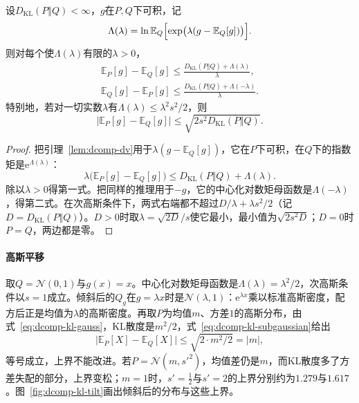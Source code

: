 \begin{theorem}[KL控制的期望差]
\label{thm:dcomp-kl-expectation}
设$D_{\mathrm{KL}}(P\Vert Q)<\infty$，$g$在$P,Q$下可积，记
\begin{equation}
 \Lambda(\lambda)=\ln\mathbb{E}_{Q}\Bigl[\exp\bigl(\lambda(g-\mathbb{E}_{Q}[g])\bigr)\Bigr] .
 \label{eq:dcomp-centered-cgf}
\end{equation}
则对每个使$\Lambda(\lambda)$有限的$\lambda>0$，
\begin{equation}
 \begin{gathered}
 \mathbb{E}_{P}[g]-\mathbb{E}_{Q}[g]\leq\frac{D_{\mathrm{KL}}(P\Vert Q)+\Lambda(\lambda)}{\lambda},\\
 \mathbb{E}_{Q}[g]-\mathbb{E}_{P}[g]\leq\frac{D_{\mathrm{KL}}(P\Vert Q)+\Lambda(-\lambda)}{\lambda} .
 \end{gathered}
 \label{eq:dcomp-kl-two-sides}
\end{equation}
特别地，若对一切实数$\lambda$有$\Lambda(\lambda)\leq\lambda^{2}s^{2}/2$，则
\begin{equation}
 \bigl\lvert\mathbb{E}_{P}[g]-\mathbb{E}_{Q}[g]\bigr\rvert\leq\sqrt{2s^{2}D_{\mathrm{KL}}(P\Vert Q)} .
 \label{eq:dcomp-kl-subgaussian}
\end{equation}
\end{theorem}

\begin{proof}
把引理~\ref{lem:dcomp-dv}用于$\lambda(g-\mathbb{E}_{Q}[g])$，它在$P$下可积，在$Q$下的指数矩是$\mathrm{e}^{\Lambda(\lambda)}$：
\[
 \lambda\bigl(\mathbb{E}_{P}[g]-\mathbb{E}_{Q}[g]\bigr)\leq D_{\mathrm{KL}}(P\Vert Q)+\Lambda(\lambda) .
\]
除以$\lambda>0$得第一式。把同样的推理用于$-g$，它的中心化对数矩母函数是$\Lambda(-\lambda)$，得第二式。在次高斯条件下，两式右端都不超过$D/\lambda+\lambda s^{2}/2$（记$D=D_{\mathrm{KL}}(P\Vert Q)$）。$D>0$时取$\lambda=\sqrt{2D}/s$使它最小，最小值为$\sqrt{2s^{2}D}$；$D=0$时$P=Q$，两边都是零。
\end{proof}

\paragraph{高斯平移}
取$Q=\mathcal{N}(0,1)$与$g(x)=x$。中心化对数矩母函数是$\Lambda(\lambda)=\lambda^{2}/2$，次高斯条件以$s=1$成立。倾斜后的$Q_g$在$g=\lambda x$时是$\mathcal{N}(\lambda,1)$：$\mathrm{e}^{\lambda x}$乘以标准高斯密度，配方后正是均值为$\lambda$的高斯密度。再取$P$为均值$m$、方差$1$的高斯分布，由式~\eqref{eq:dcomp-kl-gauss}，KL散度是$m^{2}/2$，式~\eqref{eq:dcomp-kl-subgaussian}给出
\[
 \lvert\mathbb{E}_{P}[X]-\mathbb{E}_{Q}[X]\rvert\leq\sqrt{2\cdot m^{2}/2}=\lvert m\rvert ,
\]
等号成立，上界不能改进。若$P=\mathcal{N}(m,s'^{2})$，均值差仍是$m$，而KL散度多了方差失配的部分，上界变松；$m=1$时，$s'=\tfrac12$与$s'=2$的上界分别约为$1.279$与$1.617$。图~\ref{fig:dcomp-kl-tilt}画出倾斜后的分布与这些上界。

